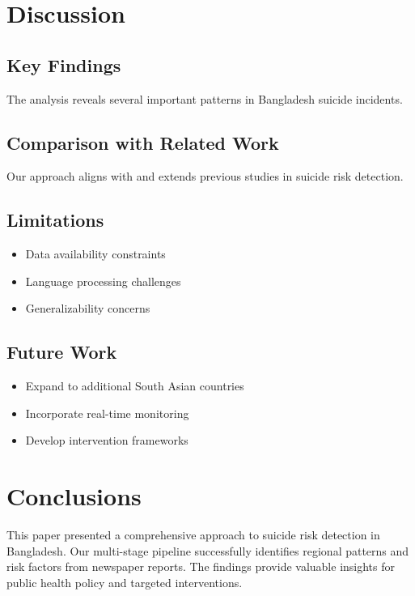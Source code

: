 \documentclass[12pt,a4paper]{article}
\begin{document}
\section{Discussion}

\subsection{Key Findings}
The analysis reveals several important patterns in Bangladesh suicide incidents.

\subsection{Comparison with Related Work}
Our approach aligns with and extends previous studies in suicide risk detection.

\subsection{Limitations}
\begin{itemize}
    \item Data availability constraints
    \item Language processing challenges
    \item Generalizability concerns
\end{itemize}

\subsection{Future Work}
\begin{itemize}
    \item Expand to additional South Asian countries
    \item Incorporate real-time monitoring
    \item Develop intervention frameworks
\end{itemize}

\section{Conclusions}

This paper presented a comprehensive approach to suicide risk detection in Bangladesh. Our multi-stage pipeline successfully identifies regional patterns and risk factors from newspaper reports. The findings provide valuable insights for public health policy and targeted interventions.
\end{document}
